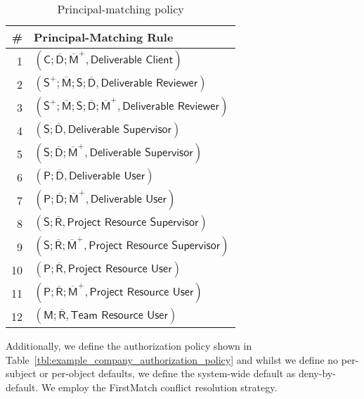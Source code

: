 \documentclass{article}
\newcommand{\comp}{\mathbin{;}}
\begin{document}
\begin{table}[!ht]\centering
  {\renewcommand{\arraystretch}{1.25}
  \begin{tabular}{|r|l|}
    \hline
        \bf \# & \bf Principal-Matching Rule \\
    \hline
    \hline
        1 & $(\textsf{C} \comp \overline{\textsf{D}} \comp \overline{\textsf{M}}^+, \textsf{Deliverable Client})$ \\
        2 & $(\textsf{S}^+ \comp \overline{\textsf{M}} \comp \textsf{S} \comp \overline{\textsf{D}}, \textsf{Deliverable Reviewer})$ \\
        3 & $(\textsf{S}^+ \comp \overline{\textsf{M}} \comp \textsf{S} \comp \overline{\textsf{D}} \comp \overline{\textsf{M}}^+, \textsf{Deliverable Reviewer})$ \\
        4 & $(\textsf{S} \comp \overline{\textsf{D}}, \textsf{Deliverable Supervisor})$ \\
        5 & $(\textsf{S} \comp \overline{\textsf{D}} \comp \overline{\textsf{M}}^+, \textsf{Deliverable Supervisor})$ \\
        6 & $(\textsf{P} \comp \overline{\textsf{D}}, \textsf{Deliverable User})$ \\
        7 & $(\textsf{P} \comp \overline{\textsf{D}} \comp \overline{\textsf{M}}^+, \textsf{Deliverable User})$ \\
        8 & $(\textsf{S} \comp \overline{\textsf{R}}, \textsf{Project Resource Supervisor})$ \\
        9 & $(\textsf{S} \comp \overline{\textsf{R}} \comp \overline{\textsf{M}}^+, \textsf{Project Resource Supervisor})$ \\
        10 & $(\textsf{P} \comp \overline{\textsf{R}}, \textsf{Project Resource User})$ \\
        11 & $(\textsf{P} \comp \overline{\textsf{R}} \comp \overline{\textsf{M}}^+, \textsf{Project Resource User})$ \\
        12 & $(\textsf{M} \comp \overline{\textsf{R}}, \textsf{Team Resource User})$ \\
    \hline
  \end{tabular}}
\caption{Principal-matching policy}\label{tbl:example_company_principal_matching_policy}
\end{table}

Additionally, we define the authorization policy shown in Table~\ref{tbl:example_company_authorization_policy} and whilst we define no per-subject or per-object defaults, we define the system-wide default as \textsf{deny-by-default}. We employ the \textsf{FirstMatch} conflict resolution strategy.
\end{document}
